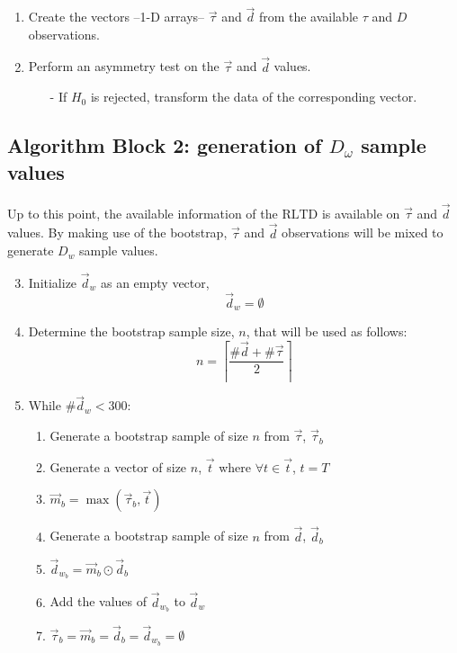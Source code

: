 \documentclass[letterpaper]{article}
\begin{document}
\begin{enumerate}
	\item Create the vectors --1-D arrays--  $\vec{\tau}$ and $\vec{d}$ from the available $\tau$ and $D$ observations.
	\item Perform an asymmetry test on the $\vec{\tau}$ and $\vec{d}$ values.
	\begin{itemize} 
		\item[-] If $H_0$ is rejected, transform the data of the corresponding vector.
	\end{itemize}
	  
\end{enumerate}

\FloatBarrier

\subsection*{Algorithm Block 2: generation of $D_\omega$ sample values}
\paragraph{}
Up to this point, the available information of the $\mathrm{RLTD}$ is available on $\vec{\tau}$ and $\vec{d}$ values. By making use of the bootstrap, $\vec{\tau}$ and $\vec{d}$ observations will be mixed to generate $D_w$ sample values. 


\begin{enumerate}
	\setcounter{enumi}{2}
	\item Initialize $\vec{d}_{w}$ as an empty vector,
		\begin{equation}
			\vec{d}_w=\emptyset
		\end{equation}
	\item Determine the bootstrap sample size, $n$, that will be used as follows:
		\begin{equation}
			n =\left\lceil\frac{\#\vec{d}+\#\vec{\tau}}{2}\right\rceil
		\end{equation}
	\item While $\#\vec{d}_w<300$:
		\begin{enumerate}
			\item Generate a bootstrap sample of size $n$ from $\vec{\tau}$, $\vec{\tau}_b$
			\item Generate a vector of size $n$, $\vec{t}$ where $\forall{t}\in{\vec{t}}$, $t=T$
			\item $\vec{m}_b = \max({\vec{\tau}_b, \vec{t}})$
			\item Generate a bootstrap sample of size $n$ from $\vec{d}$, $\vec{d}_b$
			\item $\vec{d}_{w_b}=\vec{m}_b\odot{\vec{d}_b}$
			\item Add the values of $\vec{d}_{w_b}$ to $\vec{d}_{w}$
			\item $\vec{\tau}_b=\vec{m}_b=\vec{d}_b=\vec{d}_{w_b}=\emptyset$
		\end{enumerate}
\end{enumerate}
\end{document}
